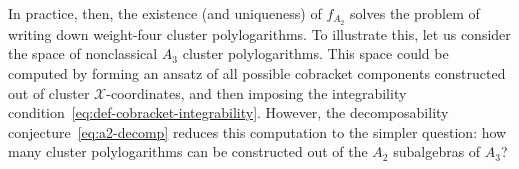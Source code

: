 \documentclass[11pt]{article}
\def\xcoords{$\mathcal{X}$-coordinates}
\begin{document}


In practice, then, the existence (and uniqueness) of $f_{A_2}$ solves the problem of writing down weight-four cluster polylogarithms. To illustrate this, let us consider the space of nonclassical $A_3$ cluster polylogarithms. This space could be computed by forming an ansatz of all possible cobracket components constructed out of cluster \xcoords, and then imposing the integrability condition~\eqref{eq:def-cobracket-integrability}. However, the decomposability conjecture~\eqref{eq:a2-decomp} reduces this computation to the simpler question: how many cluster polylogarithms can be constructed out of the $A_2$ subalgebras of $A_3$? 
\end{document}
